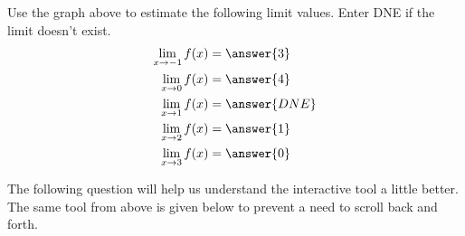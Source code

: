 \documentclass{ximera}
\begin{document}
\begin{exercise}
   	\begin{question} Use the graph above to estimate the following limit values.  Enter DNE if the limit doesn't exist.
   		\begin{align*}
   			\lim\limits_{x \to -1}f(x) &= \answer{3} \\
   			\lim\limits_{x \to 0}f(x) &= \answer{4} \\
   			\lim\limits_{x \to 1}f(x) &= \answer{DNE} \\
   			\lim\limits_{x \to 2}f(x) &= \answer{1} \\
   			\lim\limits_{x \to 3}f(x) &= \answer{0} 
   		\end{align*}
   	\end{question}
   	
   	The following question will help us understand the interactive tool a little better.  The same tool from above is given below to prevent a need to scroll back and forth.
   	
   	\begin{center}
   		\begin{onlineOnly}
   		\end{onlineOnly} 
   	\end{center}
   	

\end{exercise}
\end{document}
